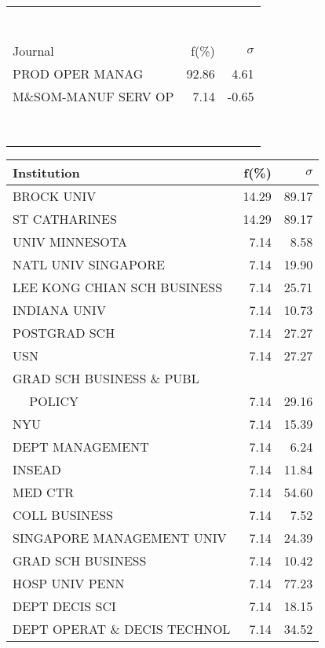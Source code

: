 \documentclass[a4paper,11pt]{report}
\begin{document}
\begin{landscape}
\begin{table}[!ht]
{\begin{tabular}{|l r  r|}
 &  & \\
 &  & \\
 &  & \\
 &  & \\
 &  & \\
 &  & \\
 &  & \\
\hline
\hline
Journal & f(\%) & $\sigma$\\
\hline
PROD OPER MANAG & 92.86 & 4.61\\
M\&SOM-MANUF SERV OP & 7.14 & -0.65\\
 &  & \\
 &  & \\
 &  & \\
 &  & \\
 &  & \\
 &  & \\
 &  & \\
 &  & \\
\hline
\end{tabular}
}
{\scriptsize\begin{tabular}{|l r r|}
\hline
Institution & f(\%) & $\sigma$\\
\hline
BROCK UNIV & 14.29 & 89.17\\
ST CATHARINES & 14.29 & 89.17\\
UNIV MINNESOTA & 7.14 & 8.58\\
NATL UNIV SINGAPORE & 7.14 & 19.90\\
LEE KONG CHIAN SCH BUSINESS & 7.14 & 25.71\\
INDIANA UNIV & 7.14 & 10.73\\
POSTGRAD SCH & 7.14 & 27.27\\
USN & 7.14 & 27.27\\
GRAD SCH BUSINESS \& PUBL &  & \\
$\quad$ POLICY & 7.14 & 29.16\\
NYU & 7.14 & 15.39\\
DEPT MANAGEMENT & 7.14 & 6.24\\
INSEAD & 7.14 & 11.84\\
MED CTR & 7.14 & 54.60\\
COLL BUSINESS & 7.14 & 7.52\\
SINGAPORE MANAGEMENT UNIV & 7.14 & 24.39\\
GRAD SCH BUSINESS & 7.14 & 10.42\\
HOSP UNIV PENN & 7.14 & 77.23\\
DEPT DECIS SCI & 7.14 & 18.15\\
DEPT OPERAT \& DECIS TECHNOL & 7.14 & 34.52\\

\end{tabular}}
\end{table}
\end{landscape}
\end{document}
